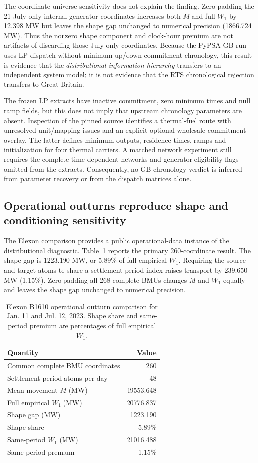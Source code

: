 \documentclass[journal]{IEEEtran}
\begin{document}
The coordinate-universe sensitivity does not explain the finding. Zero-padding the 21 July-only internal generator coordinates increases both $M$ and full $W_1$ by 12.398 MW but leaves the shape gap unchanged to numerical precision (1866.724 MW). Thus the nonzero shape component and clock-hour premium are not artifacts of discarding those July-only coordinates. Because the PyPSA-GB run uses LP dispatch without minimum-up/down commitment chronology, this result is evidence that the \emph{distributional information hierarchy} transfers to an independent system model; it is not evidence that the RTS chronological rejection transfers to Great Britain.

The frozen LP extracts have inactive commitment, zero minimum times and null ramp fields, but this does not imply that upstream chronology parameters are absent. Inspection of the pinned source identifies a thermal-fuel route with unresolved unit/mapping issues and an explicit optional wholesale commitment overlay. The latter defines minimum outputs, residence times, ramps and initialization for four thermal carriers. A matched network experiment still requires the complete time-dependent networks and generator eligibility flags omitted from the extracts. Consequently, no GB chronology verdict is inferred from parameter recovery or from the dispatch matrices alone.

\subsection{Operational outturns reproduce shape and conditioning sensitivity}
The Elexon comparison provides a public operational-data instance of the distributional diagnostic. Table~\ref{tab:elexon} reports the primary 260-coordinate result. The shape gap is 1223.190 MW, or 5.89\% of full empirical $W_1$. Requiring the source and target atoms to share a settlement-period index raises transport by 239.650 MW (1.15\%). Zero-padding all 268 complete BMUs changes $M$ and $W_1$ equally and leaves the shape gap unchanged to numerical precision.

\begin{table}[t]
\caption{Elexon B1610 operational outturn comparison for Jan. 11 and Jul. 12, 2023. Shape share and same-period premium are percentages of full empirical $W_1$.}
\label{tab:elexon}
\centering
\footnotesize
\begin{tabular}{lr}
\toprule
Quantity & Value\\
\midrule
Common complete BMU coordinates & 260\\
Settlement-period atoms per day & 48\\
Mean movement $M$ (MW) & 19553.648\\
Full empirical $W_1$ (MW) & 20776.837\\
Shape gap (MW) & 1223.190\\
Shape share & 5.89\%\\
Same-period $W_1$ (MW) & 21016.488\\
Same-period premium & 1.15\%\\
\bottomrule
\end{tabular}
\end{table}
\end{document}

